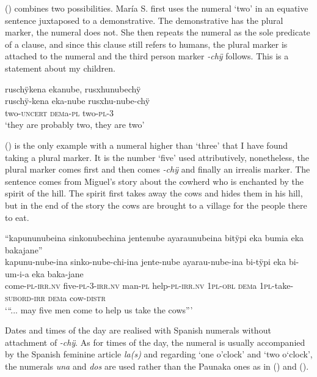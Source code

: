 () combines two possibilities. María S. first uses the numeral ‘two’ in an equative sentence juxtaposed to a demonstrative. The demonstrative has the plural marker, the numeral does not. She then repeats the numeral as the sole predicate of a clause, and since this clause still refers to humans, the plural marker is attached to the numeral and the third person marker \textit{-chÿ} follows. This is a statement about my children.

\ea\label{ex:two-4}
\begingl
\glpreamble ruschÿkena ekanube, rusxhunubechÿ\\
\gla ruschÿ-kena eka-nube rusxhu-nube-chÿ\\
\glb two-\textsc{uncert} \textsc{dem}a-\textsc{pl} two-\textsc{pl}-3\\
\glft ‘they are probably two, they are two’
\endgl
\trailingcitation{[rmx-e150922l.078]}
\xe

() is the only example with a numeral higher than ‘three’ that I have found taking a plural marker. It is the number ‘five’ used attributively, nonetheless, the plural marker comes first and then comes \textit{-chÿ} and finally an irrealis marker. The sentence comes from Miguel’s story about the cowherd who is enchanted by the spirit of the hill. The spirit first takes away the cows and hides them in his hill, but in the end of the story the cows are brought to a village for the people there to eat. 

\ea\label{ex:five-1}
\begingl 
\glpreamble “kapununubeina sinkonubechina jentenube ayaraunubeina bitÿpi eka bumia eka bakajane”\\
\gla kapunu-nube-ina sinko-nube-chi-ina jente-nube ayarau-nube-ina bi-tÿpi eka bi-um-i-a eka baka-jane\\ 
\glb come-\textsc{pl}-\textsc{irr.nv} five-\textsc{pl}-3-\textsc{irr.nv} man-\textsc{pl} help-\textsc{pl}-\textsc{irr.nv} 1\textsc{pl}-\textsc{obl} \textsc{dem}a 1\textsc{pl}-take-\textsc{subord}-\textsc{irr} \textsc{dem}a cow-\textsc{distr}\\ 
\glft ‘“... may five men come to help us take the cows”’\\ 
\endgl
\trailingcitation{[mxx-n151017l-1.78]}
\xe

Dates and times of the day are realised with Spanish numerals without attachment of \textit{-chÿ}. As for times of the day, the numeral is usually accompanied by the Spanish feminine article \textit{la(s)} and regarding ‘one o’clock’ and ‘two o‘clock’, the numerals \textit{una} and \textit{dos} are used rather than the Paunaka ones as in () and ().

